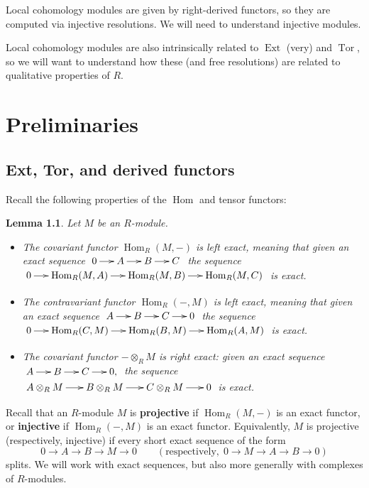 \documentclass[11pt]{book}
\newtheorem{lemma}[theorem]{Lemma}
\numberwithin{equation}{section}
\numberwithin{theorem}{chapter}
\theoremstyle{definition}
\newtheorem*{basic properties}{Basic Properties}
\newtheorem*{Important Remark}{Important Remark}
\theoremstyle{remark}
\newcommand{\Hom}{\operatorname{Hom}}
\newcommand{\Ext}{\operatorname{Ext}}
\newcommand{\Tor}{\operatorname{Tor}}
\begin{document}
Local cohomology modules are given by right-derived functors, so they are computed via injective resolutions. We will need to understand injective modules.

Local cohomology modules are also intrinsically related to $\Ext$ (very) and $\Tor$, so we will want to understand how these (and free resolutions) are related to qualitative properties of $R$.








\chapter{Preliminaries}

\section{Ext, Tor, and derived functors}

Recall the following properties of the $\Hom$ and tensor functors:

\begin{lemma}
Let $M$ be an $R$-module.
\begin{itemize}
	\item The covariant functor $\Hom_R(M,-)$ is left exact, meaning that given an exact sequence $\xymatrix@C=5mm{0 \ar[r] & A \ar[r] & B \ar[r] & C}$ the sequence $\xymatrix@C=5mm{0 \ar[r] & \Hom_R(M,A) \ar[r] & \Hom_R(M,B) \ar[r] & \Hom_R(M,C)}$ is exact.
	\item The contravariant functor $\Hom_R(-,M)$ is left exact, meaning that given an exact sequence $\xymatrix@C=5mm{ A \ar[r] & B \ar[r] & C \ar[r] & 0}$ the sequence $\xymatrix@C=5mm{0 \ar[r] & \Hom_R(C,M) \ar[r] & \Hom_R(B,M) \ar[r] & \Hom_R(A,M)}$ is exact.
	\item The covariant functor $- \otimes_R M$ is right exact: given an exact sequence $\xymatrix@C=5mm{A \ar[r] & B \ar[r] & C \ar[r] & 0,}$ the sequence $\xymatrix@C=6mm{A \otimes_R M \ar[r] & B \otimes_R M \ar[r] & C \otimes_R M \ar[r] & 0}$ is exact.
\end{itemize}
\end{lemma}

Recall that an $R$-module $M$ is {\bf projective} if $\Hom_R(M,-)$ is an exact functor, or {\bf injective} if $\Hom_R(-,M)$ is an exact functor. Equivalently, $M$ is projective (respectively, injective) if every short exact sequence of the form
\[0\to A \to B \to M \to 0 \qquad (\text{respectively,} \ \ 0\to M\to A \to B \to 0)\] splits. We will work with exact sequences, but also more generally with complexes of $R$-modules.
\end{document}
